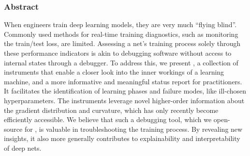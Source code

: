 \subsubsection{Abstract}

When engineers train deep learning models, they are very much ``flying blind''.
Commonly used methods for real-time training diagnostics, such as monitoring the
train/test loss, are limited. Assessing a net's training process solely through
these performance indicators is akin to debugging software without access to
internal states through a debugger. To address this, we present \cockpit, a
collection of instruments that enable a closer look into the inner workings of a
learning machine, and a more informative and meaningful status report for
practitioners. It facilitates the identification of learning phases and failure
modes, like ill-chosen hyperparameters. The instruments leverage novel
higher-order information about the gradient distribution and curvature, which
has only recently become efficiently accessible. We believe that such a
debugging tool, which we open-source for \pytorch, is valuable in
troubleshooting the training process. By revealing new insights, it also more
generally contributes to explainability and interpretability of deep nets.


